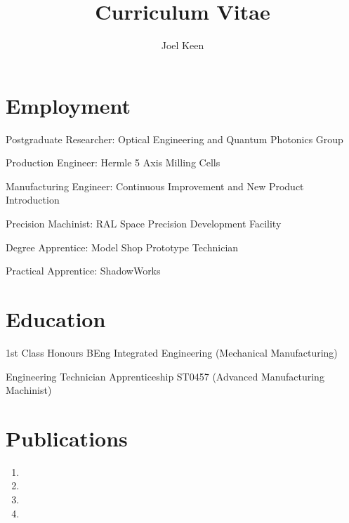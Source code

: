 \documentclass{cv}
\title{Curriculum Vitae}
\author{Joel Keen}
\begin{document}


\maketitle

\section{Employment}

Postgraduate Researcher: Optical Engineering and Quantum Photonics Group

Production Engineer: Hermle 5 Axis Milling Cells

Manufacturing Engineer: Continuous Improvement and New Product Introduction

Precision Machinist: RAL Space Precision Development Facility

Degree Apprentice: Model Shop Prototype Technician 

Practical Apprentice: ShadowWorks

\section{Education}

1st Class Honours BEng Integrated Engineering (Mechanical Manufacturing)

 Engineering Technician Apprenticeship ST0457 (Advanced Manufacturing Machinist)

\section{Publications}
\begin{enumerate}

\item{}

\item{}

\item{}

\item{}


\end{enumerate}
\end{document}
